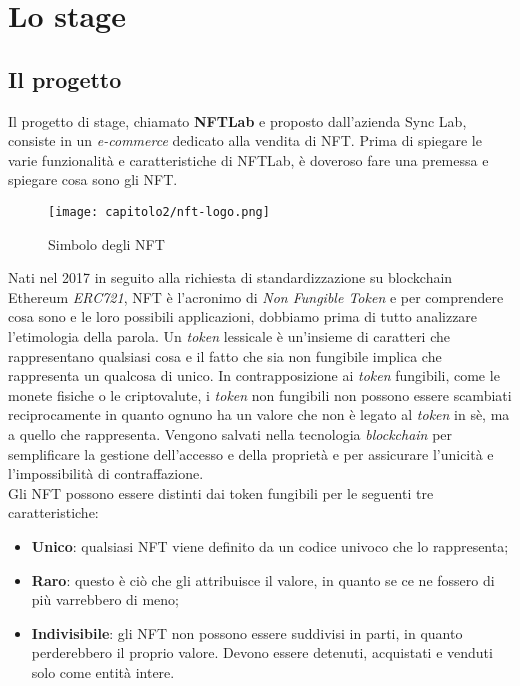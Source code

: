 
\chapter{Lo stage}
\label{cap:stage}


\section{Il progetto}
Il progetto di stage, chiamato \textbf{NFTLab} e proposto dall'azienda Sync Lab, consiste in un \textit{e-commerce} dedicato alla vendita di NFT. Prima di spiegare le varie funzionalità e caratteristiche di NFTLab, è doveroso fare una premessa e spiegare cosa sono gli NFT. \\

\begin{figure}[!h]
  \centering
  \texttt{[image: capitolo2/nft-logo.png]}
  \caption{Simbolo degli NFT}
\end{figure}

Nati nel 2017 in seguito alla richiesta di standardizzazione su blockchain Ethereum \textit{ERC721}, NFT è l'acronimo di \textit{Non Fungible Token} e per comprendere cosa sono e le loro possibili applicazioni, dobbiamo prima di tutto analizzare l'etimologia della parola.
Un \textit{token} lessicale è un'insieme di caratteri che rappresentano qualsiasi cosa e il fatto che sia non fungibile implica che rappresenta un qualcosa di unico.
In contrapposizione ai \textit{token} fungibili, come le monete fisiche o le \gls{criptovalute}, i \textit{token} non fungibili non possono essere scambiati reciprocamente in quanto ognuno ha un valore che non è legato al \textit{token} in sè, ma a quello che rappresenta.
Vengono salvati nella tecnologia \textit{blockchain} per semplificare la gestione dell'accesso e della proprietà e per assicurare l'unicità e l'impossibilità di contraffazione. \\

\noindent Gli NFT possono essere distinti dai token fungibili per le seguenti tre caratteristiche:
\begin{itemize}
  \item \textbf{Unico}: qualsiasi NFT viene definito da un codice univoco che lo rappresenta;
  \item \textbf{Raro}: questo è ciò che gli attribuisce il valore, in quanto se ce ne fossero di più varrebbero di meno;
  \item \textbf{Indivisibile}: gli NFT non possono essere suddivisi in parti, in quanto perderebbero il proprio valore. Devono essere detenuti, acquistati e venduti solo come entità intere.
\end{itemize}

